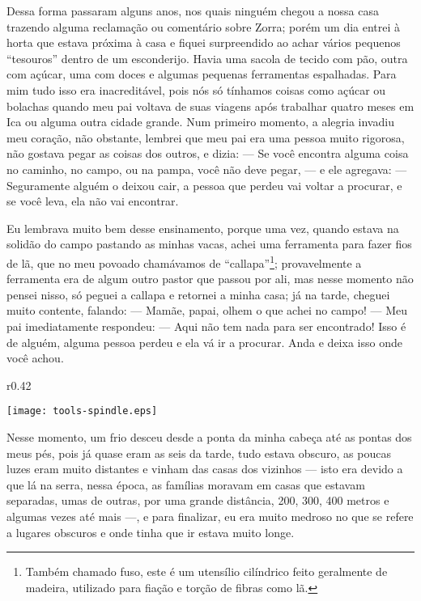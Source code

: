 Dessa forma passaram alguns anos, nos quais ninguém chegou a nossa casa trazendo alguma reclamação ou comentário sobre Zorra; porém um dia entrei à horta que estava próxima à casa e fiquei surpreendido ao achar vários pequenos ``tesouros'' dentro de um esconderijo. Havia uma sacola de tecido com pão, outra com açúcar, uma com doces e algumas pequenas ferramentas espalhadas. 
Para mim tudo isso era inacreditável, pois nós só tínhamos coisas como açúcar ou bolachas quando meu pai voltava de suas viagens após trabalhar quatro meses em Ica ou alguma outra cidade grande.
Num primeiro momento, a alegria invadiu meu coração, não obstante, lembrei que meu pai era uma pessoa muito rigorosa, não gostava pegar as coisas dos outros, e dizia: 
--- Se você encontra alguma coisa no caminho, no campo, ou na pampa, você não deve pegar, --- 
e ele agregava: 
--- Seguramente alguém o deixou cair, a pessoa que perdeu vai voltar a procurar, e se você leva, ela não vai encontrar.

Eu lembrava muito bem desse ensinamento, porque uma vez, quando estava na solidão do campo pastando as minhas vacas, achei uma ferramenta para fazer fios de lã, que no meu povoado chamávamos de ``callapa''\footnote{Também chamado fuso, este é um utensílio cilíndrico feito geralmente de madeira, utilizado para fiação e torção de fibras como lã.}; provavelmente a ferramenta era de algum outro pastor que passou por ali, mas nesse momento não pensei nisso, só peguei a callapa e retornei a minha casa; já na tarde, cheguei  muito contente, falando: 
--- Mamãe, papai, olhem o que achei no campo! --- 
Meu pai imediatamente respondeu: 
--- Aqui não tem nada para ser encontrado! Isso é de alguém, alguma pessoa perdeu e ela vá ir a procurar. Anda e deixa isso onde você achou.

\begin{wrapfigure}{r}{0.42\textwidth}
  \begin{center}
  \vspace{-10pt}
    \texttt{[image: tools-spindle.eps]}
  \end{center}
  \vspace{-20pt}
\end{wrapfigure}
Nesse momento, um frio desceu desde a ponta da minha cabeça até as pontas dos meus pés, pois já quase eram as seis da tarde, tudo estava obscuro, as poucas luzes eram muito distantes e vinham das casas dos vizinhos --- isto era devido a que lá na serra, nessa época, as famílias moravam em casas que estavam separadas, umas de outras, por uma grande distância, 200, 300, 400 metros e algumas vezes até mais ---, e para finalizar, eu era muito medroso no que se refere a lugares obscuros e onde tinha que ir estava muito longe.

